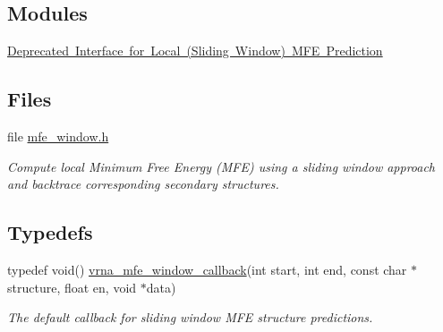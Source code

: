 \subsection*{Modules}
\begin{DoxyCompactItemize}
\item 
\mbox{\hyperlink{group__mfe__window__deprecated}{Deprecated Interface for Local (\+Sliding Window) M\+F\+E Prediction}}
\end{DoxyCompactItemize}
\subsection*{Files}
\begin{DoxyCompactItemize}
\item 
file \mbox{\hyperlink{mfe__window_8h}{mfe\+\_\+window.\+h}}
\begin{DoxyCompactList}\small\item\em Compute local Minimum Free Energy (M\+FE) using a sliding window approach and backtrace corresponding secondary structures. \end{DoxyCompactList}\end{DoxyCompactItemize}
\subsection*{Typedefs}
\begin{DoxyCompactItemize}
\item 
typedef void() \mbox{\hyperlink{group__mfe__window_ga4f3e5bc214ef803074ace313cb9571b4}{vrna\+\_\+mfe\+\_\+window\+\_\+callback}}(int start, int end, const char $\ast$structure, float en, void $\ast$data)
\begin{DoxyCompactList}\small\item\em The default callback for sliding window M\+FE structure predictions. \end{DoxyCompactList}\end{DoxyCompactItemize}
